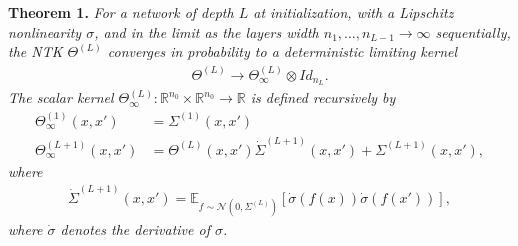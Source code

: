 \documentclass[10pt]{article}
\newcommand{\RR}{\mathbb{R}}
\newcommand{\EE}{\mathbb{E}}
\newcommand{\NN}{\mathcal{N}}
\newcommand{\paran}[1]{{( #1 )}}
\begin{document}
\textbf{Theorem 1.} \textit{For a network of depth $L$ at initialization, with a Lipschitz nonlinearity $\sigma$, and in the limit as the layers width $n_1, \ldots, n_{L - 1} \rightarrow \infty$ sequentially, the NTK $\Theta^\paran{L}$ converges in probability to a deterministic limiting kernel
\begin{align*}
\Theta^\paran{L} \rightarrow \Theta^\paran{L}_\infty \otimes Id_{n_L}.
\end{align*}
The scalar kernel $\Theta^\paran{L}_\infty : \RR^{n_0} \times \RR^{n_0} \rightarrow \RR$ is defined recursively by
\begin{align*}
\Theta^\paran{1}_\infty(x,x') &= \Sigma^\paran{1}(x,x') \\
\Theta^\paran{L + 1}_\infty(x,x') &= \Theta^\paran{L}(x,x') \dot{\Sigma}^\paran{L + 1}(x,x') + \Sigma^\paran{L + 1}(x,x'),
\end{align*}
where
\begin{align*}
\dot{\Sigma}^\paran{L + 1}(x,x') = \EE_{f \sim \NN(0,\Sigma^\paran{L})} [ \dot{\sigma}(f(x)) \dot{\sigma}(f(x'))],
\end{align*}
where $\dot{\sigma}$ denotes the derivative of $\sigma$.}
\end{document}
